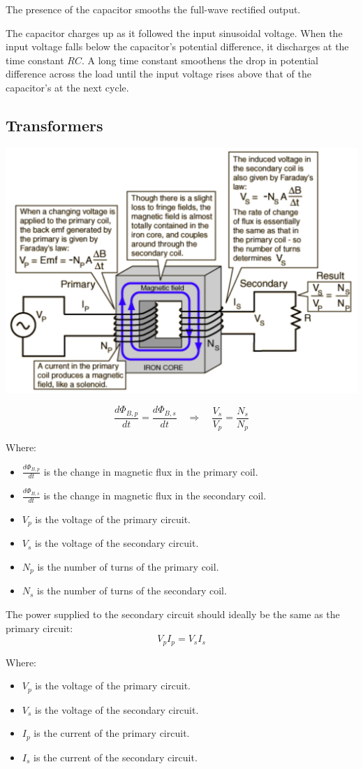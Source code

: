 \documentclass[11pt]{article}
\begin{document}
The presence of the capacitor smooths the full-wave rectified output.


The capacitor charges up as it followed the input sinusoidal voltage. When the input voltage falls below the capacitor's potential difference, it discharges at the time constant \(RC\). A long time constant smoothens the drop in potential difference across the load until the input voltage rises above that of the capacitor's at the next cycle.

\newpage
\subsection{Transformers}
\label{sec:orgc59309b}
\begin{center}
\includegraphics[width=.9\linewidth]{./images/transformers.png}
\end{center}

\[\frac{d \Phi_{B, p}}{dt} = \frac{d \Phi_{B, s}}{dt} \quad \Longrightarrow \quad \frac{V_s}{V_p} = \frac{N_s}{N_p}\]

Where:
\begin{itemize}
\item \(\frac{d \Phi_{B, p}}{dt}\) is the change in magnetic flux in the primary coil.
\item \(\frac{d \Phi_{B, s}}{dt}\) is the change in magnetic flux in the secondary coil.
\item \(V_p\) is the voltage of the primary circuit.
\item \(V_s\) is the voltage of the secondary circuit.
\item \(N_p\) is the number of turns of the primary coil.
\item \(N_s\) is the number of turns of the secondary coil.
\end{itemize}

\newpage

The power supplied to the secondary circuit should ideally be the same as the primary circuit:
\[V_p I_p = V_s I_s\]

Where:
\begin{itemize}
\item \(V_p\) is the voltage of the primary circuit.
\item \(V_s\) is the voltage of the secondary circuit.
\item \(I_p\) is the current of the primary circuit.
\item \(I_s\) is the current of the secondary circuit.
\end{itemize}
\end{document}
